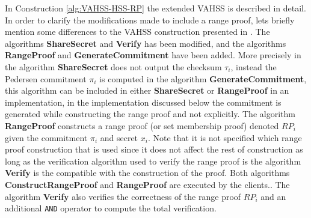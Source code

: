 In Construction \ref{alg:VAHSS-HSS-RP} the extended VAHSS is described in detail. In order to clarify the modifications made to include a range proof, lets briefly mention some differences to the VAHSS construction presented in \cite{SumItUp}.  The algorithms \textbf{ShareSecret} and \textbf{Verify} has been modified,  and the algorithms \textbf{RangeProof} and \textbf{GenerateCommitment} have been added. More precisely in the algorithm \textbf{ShareSecret} does not output the checksum $\tau_i$, instead the Pedersen commitment $\pi_i$ is computed in the algorithm \textbf{GenerateCommitment}, this algorithm can be included in either \textbf{ShareSecret}  or \textbf{RangeProof} in an implementation, in the implementation discussed below the commitment is generated while constructing the range proof and not explicitly. The algorithm \textbf{RangeProof} constructs a range proof (or set membership proof) denoted $RP_i$ given the commitment $\pi_i$ and secret $x_i$. Note that it is not specified which range proof construction that is used since it does not affect the rest of construction as long as the verification algorithm used to verify the range proof is the algorithm \textbf{Verify} is the compatible with the construction of the proof. Both algorithms \textbf{ConstructRangeProof} and \textbf{RangeProof} are executed by the clients.. The algorithm \textbf{Verify} also verifies the correctness of the range proof $RP_i$ and an additional \texttt{AND} operator to compute the total verification. 


